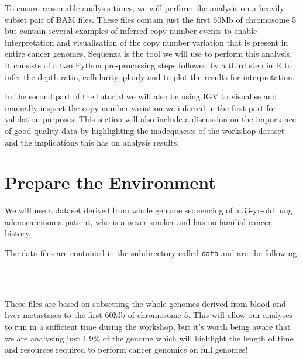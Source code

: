 To ensure reasonable analysis times, we will perform the analysis on a heavily subset pair of BAM files. These files contain just the first 60Mb of chromosome 5 but contain several examples of inferred copy number events to enable interpretation and visualisation of the copy number variation that is present in entire cancer genomes. Sequenza is the tool we will use to perform this analysis. It consists of a two Python pre-processing steps followed by a third step in R to infer the depth ratio, cellularity, ploidy and to plot the results for interpretation.

In the second part of the tutorial we will also be using IGV to visualise and manually inspect the copy number variation we inferred in the first part for validation purposes. This section will also include a discussion on the importance of good quality data by highlighting the inadequacies of the workshop dataset and the implications this has on analysis results.


\section{Prepare the Environment}

We will use a dataset derived from whole genome sequencing of a 33-yr-old lung adenocarcinoma patient, who is a never-smoker and has no familial cancer history. 

The data files are contained in the subdirectory called \texttt{data} and are the following:

\begin{description}[style=multiline,labelindent=1.5cm,align=left,leftmargin=2.5cm]
  \item[\texttt{normal.chr5.60Mb.bam} and \texttt{normal.chr5.60Mb.bam.bai}] \hfill\\
  \item[\texttt{tumour.chr5.60Mb.bam} and \texttt{tumour.chr5.60Mb.bam}] \hfill\\
  These files are based on subsetting the whole genomes derived from blood and liver metastases to the first 60Mb of chromosome 5. This will allow our analyses to run in a sufficient time during the workshop, but it's worth being aware that we are analysing just 1.9\% of the genome which will highlight the length of time and resources required to perform cancer genomics on full genomes!
\end{description}

